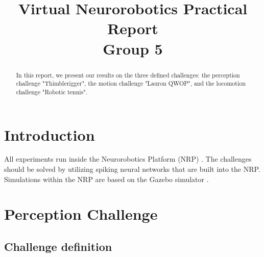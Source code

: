 \documentclass[conference]{IEEEtran}
\begin{document}
%
\title{Virtual Neurorobotics Practical Report\\Group 5}


\author{
\and

\and
{}
}

\maketitle

\begin{abstract}
In this report, we present our results on the three defined challenges: the perception challenge "Thimblerigger", the motion challenge "Lauron QWOP", and the locomotion challenge "Robotic tennis".
\end{abstract}


\IEEEpeerreviewmaketitle



\section{Introduction}
All experiments run inside the Neurorobotics Platform (NRP) \cite{nrp}. 
The challenges should be solved by utilizing spiking neural networks that are built into the NRP.
Simulations within the NRP are based on the Gazebo simulator \cite{gazebo}.

\section{Perception Challenge}

\subsection{Challenge definition}
\end{document}
